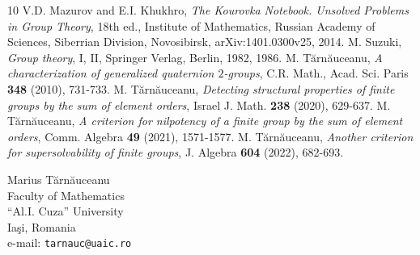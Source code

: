 \documentclass[12pt]{article}
\newcommand{\0}{{\leqno}}
\begin{document}
\begin{thebibliography}{10}
 V.D. Mazurov and E.I. Khukhro, {\it The Kourovka Notebook. Unsolved Problems in Group Theory}, 18th ed., Institute of Mathematics, Russian Academy of Sciences, Siberrian Division, Novosibirsk, arXiv:1401.0300v25, 2014.
 M. Suzuki, {\it Group theory}, I, II, Springer Verlag, Berlin, 1982, 1986.
 M. T\u arn\u auceanu, {\it A characterization of generalized quaternion $2$-groups}, C.R. Math., Acad. Sci. Paris {\bf 348} (2010), 731-733.
 M. T\u arn\u auceanu, {\it Detecting structural properties of finite groups by the sum of element orders}, Israel J. Math. {\bf 238} (2020), 629-637.
 M. T\u arn\u auceanu, {\it A criterion for nilpotency of a finite group by the sum of element orders}, Comm. Algebra {\bf 49} (2021), 1571-1577.
 M. T\u arn\u auceanu, {\it Another criterion for supersolvability of finite groups}, J. Algebra {\bf 604} (2022), 682-693.
\end{thebibliography}

\vspace*{3ex}\small

\hfill
\begin{minipage}[t]{5cm}
Marius T\u arn\u auceanu \\
Faculty of  Mathematics \\
``Al.I. Cuza'' University \\
Ia\c si, Romania \\
e-mail: {\tt tarnauc@uaic.ro}
\end{minipage}
\end{document}

